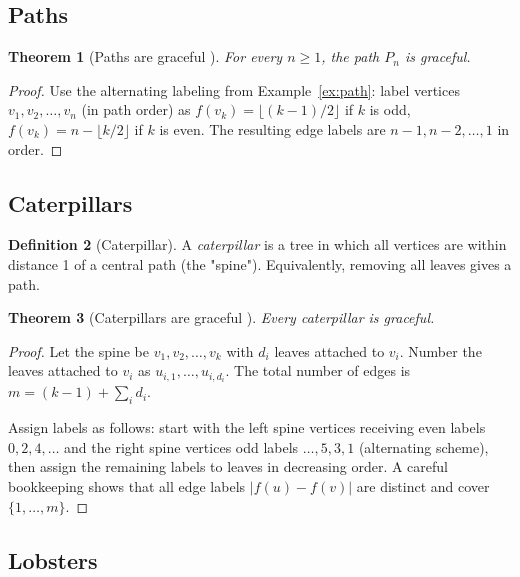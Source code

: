 \documentclass[12pt,a4paper]{amsart}
\newtheorem{theorem}{Theorem}[section]
\theoremstyle{definition}
\newtheorem{definition}[theorem]{Definition}
\theoremstyle{remark}
\begin{document}
\subsection{Paths}

\begin{theorem}[Paths are graceful \cite{Rosa1967}]\label{thm:paths}
For every $n \geq 1$, the path $P_n$ is graceful.
\end{theorem}

\begin{proof}
Use the alternating labeling from Example~\ref{ex:path}: label vertices
$v_1, v_2, \ldots, v_n$ (in path order) as
$f(v_k) = \lfloor (k-1)/2 \rfloor$ if $k$ is odd, $f(v_k) = n - \lfloor k/2 \rfloor$ if $k$ is even.
The resulting edge labels are $n-1, n-2, \ldots, 1$ in order.
\end{proof}

\subsection{Caterpillars}

\begin{definition}[Caterpillar]
A \emph{caterpillar} is a tree in which all vertices are within distance 1 of
a central path (the "spine"). Equivalently, removing all leaves gives a path.
\end{definition}

\begin{theorem}[Caterpillars are graceful \cite{Rosa1967}]\label{thm:caterpillars}
Every caterpillar is graceful.
\end{theorem}

\begin{proof}
Let the spine be $v_1, v_2, \ldots, v_k$ with $d_i$ leaves attached to $v_i$.
Number the leaves attached to $v_i$ as $u_{i,1}, \ldots, u_{i,d_i}$.
The total number of edges is $m = (k-1) + \sum_i d_i$.

Assign labels as follows: start with the left spine vertices receiving even labels
$0, 2, 4, \ldots$ and the right spine vertices odd labels $\ldots, 5, 3, 1$
(alternating scheme), then assign the remaining labels to leaves in decreasing
order. A careful bookkeeping shows that all edge labels $|f(u) - f(v)|$ are
distinct and cover $\{1, \ldots, m\}$.
\end{proof}

\subsection{Lobsters}
\end{document}
